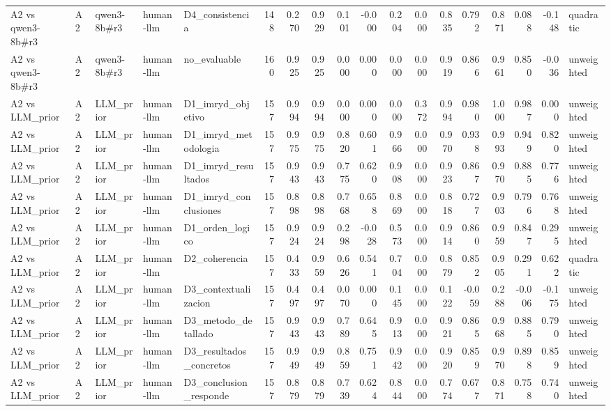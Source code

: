 \begin{table}
{\begin{tabular}{lllllrrrrrrrrrrrrl}
A2 vs qwen3-8b\#r3 & A2 & qwen3-8b\#r3 & human-llm & D4\_consistencia & 148 & 0.270 & 0.929 & 0.101 & -0.000 & 0.204 & 0.000 & 0.835 & 0.792 & 0.871 & 0.088 & -0.148 & quadratic \\
A2 vs qwen3-8b\#r3 & A2 & qwen3-8b\#r3 & human-llm & no\_evaluable & 160 & 0.925 & 0.925 & 0.000 & 0.000 & 0.000 & 0.000 & 0.919 & 0.866 & 0.961 & 0.850 & -0.036 & unweighted \\
A2 vs LLM\_prior & A2 & LLM\_prior & human-llm & D1\_imryd\_objetivo & 157 & 0.994 & 0.994 & 0.000 & 0.000 & 0.000 & 0.372 & 0.994 & 0.980 & 1.000 & 0.987 & 0.000 & unweighted \\
A2 vs LLM\_prior & A2 & LLM\_prior & human-llm & D1\_imryd\_metodologia & 157 & 0.975 & 0.975 & 0.820 & 0.601 & 0.966 & 0.000 & 0.970 & 0.938 & 0.993 & 0.949 & 0.820 & unweighted \\
A2 vs LLM\_prior & A2 & LLM\_prior & human-llm & D1\_imryd\_resultados & 157 & 0.943 & 0.943 & 0.775 & 0.620 & 0.908 & 0.000 & 0.923 & 0.867 & 0.970 & 0.885 & 0.776 & unweighted \\
A2 vs LLM\_prior & A2 & LLM\_prior & human-llm & D1\_imryd\_conclusiones & 157 & 0.898 & 0.898 & 0.768 & 0.658 & 0.869 & 0.000 & 0.818 & 0.727 & 0.903 & 0.796 & 0.768 & unweighted \\
A2 vs LLM\_prior & A2 & LLM\_prior & human-llm & D1\_orden\_logico & 157 & 0.924 & 0.924 & 0.298 & -0.028 & 0.573 & 0.000 & 0.914 & 0.860 & 0.959 & 0.847 & 0.295 & unweighted \\
A2 vs LLM\_prior & A2 & LLM\_prior & human-llm & D2\_coherencia & 157 & 0.433 & 0.959 & 0.626 & 0.541 & 0.704 & 0.000 & 0.879 & 0.852 & 0.905 & 0.291 & 0.622 & quadratic \\
A2 vs LLM\_prior & A2 & LLM\_prior & human-llm & D3\_contextualizacion & 157 & 0.497 & 0.497 & 0.070 & 0.000 & 0.145 & 0.000 & 0.122 & -0.059 & 0.288 & -0.006 & -0.175 & unweighted \\
A2 vs LLM\_prior & A2 & LLM\_prior & human-llm & D3\_metodo\_detallado & 157 & 0.943 & 0.943 & 0.789 & 0.645 & 0.913 & 0.000 & 0.921 & 0.865 & 0.968 & 0.885 & 0.790 & unweighted \\
A2 vs LLM\_prior & A2 & LLM\_prior & human-llm & D3\_resultados\_concretos & 157 & 0.949 & 0.949 & 0.859 & 0.751 & 0.942 & 0.000 & 0.920 & 0.859 & 0.970 & 0.898 & 0.859 & unweighted \\
A2 vs LLM\_prior & A2 & LLM\_prior & human-llm & D3\_conclusion\_responde & 157 & 0.879 & 0.879 & 0.739 & 0.624 & 0.844 & 0.000 & 0.774 & 0.677 & 0.871 & 0.758 & 0.740 & unweighted \\

\end{tabular}}
\end{table}
